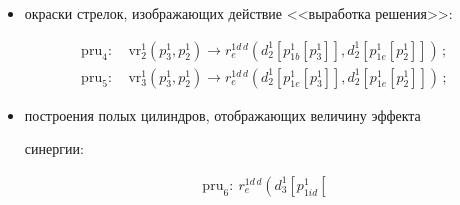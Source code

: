 \begin{itemize}
из\-ме\-ре\-ние\,--\,ви\-зу\-аль\-ное измерение>>; $r_{\mathrm{le}}^{1d\,d}$~--- отношение 


<<быть меньше либо равным>>\linebreak того же класса; $r_g^{d\,d}$~--- отношение 


<<быть больше>> того же класса; $p^1_{2s\max}\hm=\argmax\nolimits_{p^1_{2s}} 


\left( d^1_{1h}[\,p^1_{1c}[\,p^1_{2s}]]\right)$,  $p^1_{2s}\hm\in P^1_{2s}\hm= \{ 


p^1_2\vert d^1_{1r}[\,p^1_{1c}[\,p^1_2]]\hm\in d^1_{1r}[P^1_{1\,i\,i}]\wedge 


d^1_{1\varphi}[ p^1_{1c}[p^1_2]]\hm\in d_{1\varphi}^1 [ P^1_{1\,i\,i}]\}$; 


$[\,]$~--- операция <<проецирование>>, т.\,е.\ $p^1_{1c}[ \,p^1_{2i}(p^1_{1k}, 


p^1_{1l})]\hm=p^1_{1k}$; $\langle 255, 255, 255\rangle$, $\langle 255,0,0\rangle$ 


и~$\langle 0, 255, 0\rangle$~--- цветовые константы, соответствующие белому, 


красному и~зеленому цветам;


\item окраски стрелок, изображающих действие <<выработка решения>>:


\begin{align*}


\mathrm{pru}_4:\ & \mathrm{vr}_2^1\left( p_3^1, p_2^1\right) \to r_e^{1d\,d} \left( d_2^1 \left[ p^1_{1b} 


\left[ p_3^1\right]\right], d_2^1\left[ p^1_{1e}\left[ p^1_2\right]\right]\right)\,;\\[1pt]


\mathrm{pru}_5:\ & \mathrm{vr}_3^1 \left( p_3^1, p_2^1\right)\to 


r_e^{1d\,d} \left( d_2^1 \left[ p^1_{1e} \left[ p_3^1\right]\right], d_2^1\left[ 


p^1_{1e}\left[ p^1_2\right]\right]\right)\,;


\end{align*}


\item построения полых цилиндров, отображающих величину эффекта 


синергии:


\begin{multline*}


\mathrm{pru}_6:\ r_e^{1d\,d}\left( d_3^1\left[ p^1_{1id}\left[ 



\end{multline*}
\end{itemize}
